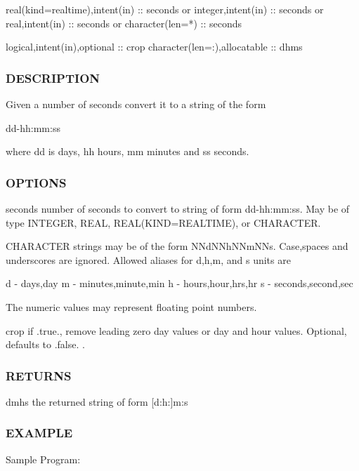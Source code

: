 \begin{DoxyVerb}
\begin{DoxyVerb}
 real(kind=realtime),intent(in) :: seconds
   or
 integer,intent(in)             :: seconds
   or
 real,intent(in)                :: seconds
   or
 character(len=*)               :: seconds

 logical,intent(in),optional    :: crop
 character(len=:),allocatable   :: dhms
\end{DoxyVerb}


\subsubsection*{D\+E\+S\+C\+R\+I\+P\+T\+I\+ON}

Given a number of seconds convert it to a string of the form

dd-\/hh\+:mm\+:ss

where dd is days, hh hours, mm minutes and ss seconds.

\subsubsection*{O\+P\+T\+I\+O\+NS}

seconds number of seconds to convert to string of form dd-\/hh\+:mm\+:ss. May be of type I\+N\+T\+E\+G\+ER, R\+E\+AL, R\+E\+AL(K\+I\+ND=R\+E\+A\+L\+T\+I\+ME), or C\+H\+A\+R\+A\+C\+T\+ER.

C\+H\+A\+R\+A\+C\+T\+ER strings may be of the form N\+Nd\+N\+Nh\+N\+Nm\+N\+Ns. Case,spaces and underscores are ignored. Allowed aliases for d,h,m, and s units are \begin{DoxyVerb}d -  days,day
m -  minutes,minute,min
h -  hours,hour,hrs,hr
s -  seconds,second,sec
\end{DoxyVerb}


The numeric values may represent floating point numbers.

crop if .true., remove leading zero day values or day and hour values. Optional, defaults to .false. . \subsubsection*{R\+E\+T\+U\+R\+NS}

dmhs the returned string of form \mbox{[}d\+:h\+:\mbox{]}m\+:s

\subsubsection*{E\+X\+A\+M\+P\+LE}

\begin{DoxyVerb}Sample Program:


\end{DoxyVerb}
\end{DoxyVerb}
